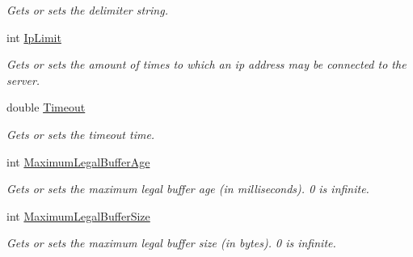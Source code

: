 \begin{DoxyCompactItemize}
\begin{DoxyCompactList}\small\item\em Gets or sets the delimiter string. \end{DoxyCompactList}\item 
\hypertarget{classAsterion_1_1Server_ac2ff4d6107ed236a3db7ce68d0a7c81a}{int \hyperlink{classAsterion_1_1Server_ac2ff4d6107ed236a3db7ce68d0a7c81a}{Ip\-Limit}}\label{classAsterion_1_1Server_ac2ff4d6107ed236a3db7ce68d0a7c81a}

\begin{DoxyCompactList}\small\item\em Gets or sets the amount of times to which an ip address may be connected to the server. \end{DoxyCompactList}\item 
\hypertarget{classAsterion_1_1Server_a17f872487518e6756d5b089dbcda7268}{double \hyperlink{classAsterion_1_1Server_a17f872487518e6756d5b089dbcda7268}{Timeout}}\label{classAsterion_1_1Server_a17f872487518e6756d5b089dbcda7268}

\begin{DoxyCompactList}\small\item\em Gets or sets the timeout time. \end{DoxyCompactList}\item 
\hypertarget{classAsterion_1_1Server_ace4f1bb6b79712ee78198c187b6ead84}{int \hyperlink{classAsterion_1_1Server_ace4f1bb6b79712ee78198c187b6ead84}{Maximum\-Legal\-Buffer\-Age}}\label{classAsterion_1_1Server_ace4f1bb6b79712ee78198c187b6ead84}

\begin{DoxyCompactList}\small\item\em Gets or sets the maximum legal buffer age (in milliseconds). 0 is infinite. \end{DoxyCompactList}\item 
\hypertarget{classAsterion_1_1Server_aadb0c4b83cd66978060719b3c9f9bd59}{int \hyperlink{classAsterion_1_1Server_aadb0c4b83cd66978060719b3c9f9bd59}{Maximum\-Legal\-Buffer\-Size}}\label{classAsterion_1_1Server_aadb0c4b83cd66978060719b3c9f9bd59}

\begin{DoxyCompactList}\small\item\em Gets or sets the maximum legal buffer size (in bytes). 0 is infinite. \end{DoxyCompactList}\end{DoxyCompactItemize}
